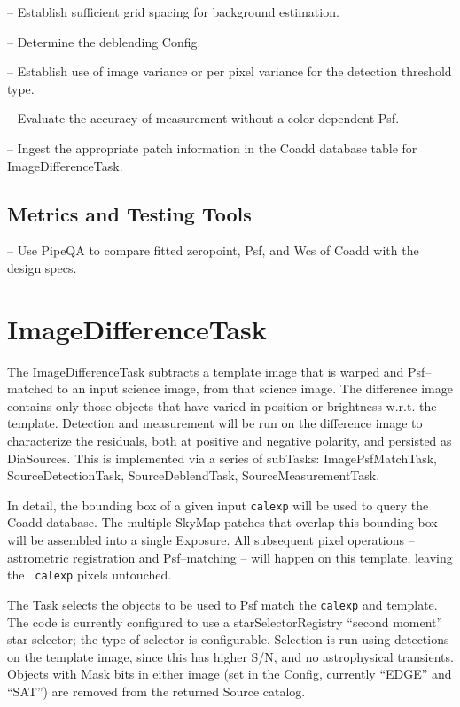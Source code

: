 \documentclass[prd, nofootinbib, floatfix, 11pt,tightenlines,times]{article}
\begin{document}
-- Establish sufficient grid spacing for background estimation.

-- Determine the deblending Config.

-- Establish use of image variance or per pixel variance for the detection threshold type.

-- Evaluate the accuracy of measurement without a color dependent Psf.

-- Ingest the appropriate patch information in the Coadd database table for ImageDifferenceTask.


\subsection{Metrics and Testing Tools}

-- Use PipeQA to compare fitted zeropoint, Psf, and Wcs of Coadd with the design specs.


\section{ImageDifferenceTask \label{sec-imagedifftask}} 



The ImageDifferenceTask subtracts a template image that is warped and
Psf--matched to an input science image, from that science image.  The
difference image contains only those objects that have varied in
position or brightness w.r.t. the template.  Detection and measurement
will be run on the difference image to characterize the residuals,
both at positive and negative polarity, and persisted as DiaSources.
This is implemented via a series of subTasks: ImagePsfMatchTask,
SourceDetectionTask, SourceDeblendTask, SourceMeasurementTask.

In detail, the bounding box of a given input {\tt calexp} will be used
to query the Coadd database.  The multiple SkyMap patches that overlap
this bounding box will be assembled into a single Exposure.  All
subsequent pixel operations -- astrometric registration and
Psf--matching -- will happen on this template, leaving the {\tt
  calexp} pixels untouched.

The Task selects the objects to be used to Psf match the {\tt calexp}
and template.  The code is currently configured to use a
starSelectorRegistry ``second moment'' star selector; the type of
selector is configurable.  Selection is run using detections on the
template image, since this has higher S/N,
and no astrophysical transients.  Objects with Mask bits in either
image (set in the Config, currently ``EDGE'' and ``SAT'') are removed
from the returned Source catalog.
\end{document}
